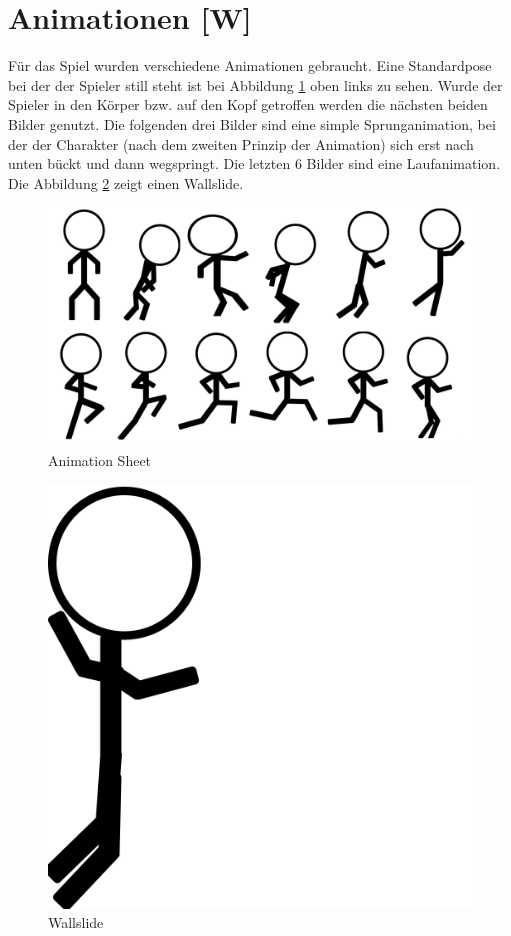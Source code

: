 \section{Animationen [W]} \label{animations}
Für das Spiel wurden verschiedene Animationen gebraucht. Eine Standardpose bei der der Spieler still steht ist bei Abbildung \ref{AnimationSheet} oben links zu sehen.
Wurde der Spieler in den Körper bzw. auf den Kopf getroffen werden die nächsten beiden Bilder genutzt. Die folgenden drei Bilder sind eine simple Sprunganimation, bei der der Charakter (nach dem zweiten Prinzip der Animation) sich erst nach unten bückt und dann wegspringt.
Die letzten 6 Bilder sind eine Laufanimation. Die Abbildung \ref{Wallslide} zeigt einen Wallslide.
\begin{figure}[H]
    \centering
    \includegraphics[scale=0.3]{pics/AnimationSheet.png}
    \caption{Animation Sheet}
    \label{AnimationSheet}
\end{figure}

\begin{figure}[H]
    \centering
    \includegraphics[scale=0.1]{pics/ScribblePNG/Wallslide.png}
    \caption{Wallslide}
    \label{Wallslide}
\end{figure}


